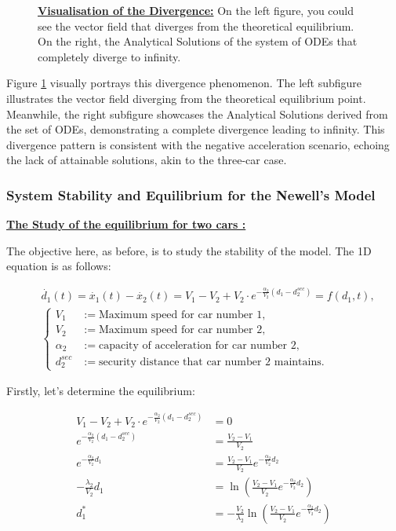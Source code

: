 \documentclass{article}
\begin{document}
\begin{figure}[H]
\begin{subfigure}{0.45\textwidth}
			\end{subfigure}
			\caption[Visualisation of the Divergence]{\textbf{\underline{Visualisation of the Divergence:}} On the left figure, you could see the vector field that diverges from the theoretical equilibrium. On the right, the Analytical Solutions of the system of ODEs that completely diverge to infinity.}
			\label{fig:SE2}
		\end{figure}
		
		Figure \ref{fig:SE2} visually portrays this divergence phenomenon. The left subfigure illustrates the vector field diverging from the theoretical equilibrium point. Meanwhile, the right subfigure showcases the Analytical Solutions derived from the set of ODEs, demonstrating a complete divergence leading to infinity. This divergence pattern is consistent with the negative acceleration scenario, echoing the lack of attainable solutions, akin to the three-car case.
		
		
	\subsubsection{System Stability and Equilibrium for the Newell's Model}
	
	\textbf{\underline{The Study of the equilibrium for two cars : }} \newline\newline
	
	
	The objective here, as before, is to study the stability of the model. The 1D equation is as follows:
	
	\begin{align*}
		&\dot{d_1}(t) = \dot{x_1}(t) - \dot{x_2}(t) = V_1 - V_2 + V_2 \cdot e^{-\frac{\alpha_2}{V_2}(d_1 - d_{2}^{sec})} = f(d_1, t), \\
		&\left\{
		\begin{aligned}
			V_1 &:= \text{Maximum speed for car number 1}, \\
			V_2 &:= \text{Maximum speed for car number 2}, \\
			\alpha_2 &:= \text{capacity of acceleration for car number 2}, \\
			d_{2}^{sec} &:= \text{security distance that car number 2 maintains}.
		\end{aligned}
		\right.
	\end{align*}
	
	Firstly, let's determine the equilibrium:
	
	\begin{align*}
		V_1 - V_2 + V_2 \cdot e^{-\frac{\alpha_2}{V_2}(d_1 - d_{2}^{sec})} &= 0 \\
		e^{-\frac{\alpha_2}{V_2}(d_1 - d_{2}^{sec})} &= \frac{V_2-V_1}{V_2} \\
		e^{-\frac{\alpha_2}{V_2}d_1} &= \frac{V_2-V_1}{V_2}e^{-\frac{\alpha_2}{V_2}d_2} \\
		-\frac{\lambda_2}{V_2}d_1 &= \ln \left(\frac{V_2-V_1}{V_2}e^{-\frac{\alpha_2}{V_2}d_2} \right) \\
		d_1^* &= -\frac{V_2}{\lambda_2}\ln \left(\frac{V_2-V_1}{V_2}e^{-\frac{\alpha_2}{V_2}d_2} \right)
	\end{align*}
	
\end{document}
